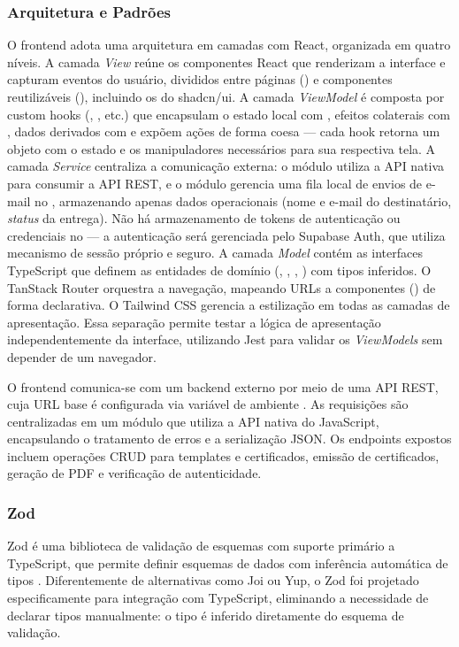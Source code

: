 \subsubsection{Arquitetura e Padrões}
O frontend adota uma arquitetura em camadas com React, organizada em quatro níveis. A camada \textit{View} reúne os componentes React que renderizam a interface e capturam eventos do usuário, divididos entre páginas () e componentes reutilizáveis (), incluindo os do shadcn/ui. A camada \textit{ViewModel} é composta por custom hooks (, , etc.) que encapsulam o estado local com , efeitos colaterais com , dados derivados com  e expõem ações de forma coesa --- cada hook retorna um objeto com o estado e os manipuladores necessários para sua respectiva tela. A camada \textit{Service} centraliza a comunicação externa: o módulo  utiliza a  API nativa para consumir a API REST, e o módulo  gerencia uma fila local de envios de e-mail no , armazenando apenas dados operacionais (nome e e-mail do destinatário, \textit{status} da entrega). Não há armazenamento de tokens de autenticação ou credenciais no  --- a autenticação será gerenciada pelo Supabase Auth, que utiliza mecanismo de sessão próprio e seguro. A camada \textit{Model} contém as interfaces TypeScript que definem as entidades de domínio (, , , ) com tipos inferidos. O TanStack Router orquestra a navegação, mapeando URLs a componentes () de forma declarativa. O Tailwind CSS gerencia a estilização em todas as camadas de apresentação. Essa separação permite testar a lógica de apresentação independentemente da interface, utilizando Jest para validar os \textit{ViewModels} sem depender de um navegador.

\label{sec:api}

O frontend comunica-se com um backend externo por meio de uma API REST, cuja URL base é configurada via variável de ambiente . As requisições são centralizadas em um módulo  que utiliza a  API nativa do JavaScript, encapsulando o tratamento de erros e a serialização JSON. Os endpoints expostos incluem operações CRUD para templates e certificados, emissão de certificados, geração de PDF e verificação de autenticidade.

\subsubsection{Zod}
Zod é uma biblioteca de validação de esquemas com suporte primário a TypeScript, que permite definir esquemas de dados com inferência automática de tipos \cite{zod2025}. Diferentemente de alternativas como Joi ou Yup, o Zod foi projetado especificamente para integração com TypeScript, eliminando a necessidade de declarar tipos manualmente: o tipo é inferido diretamente do esquema de validação.


